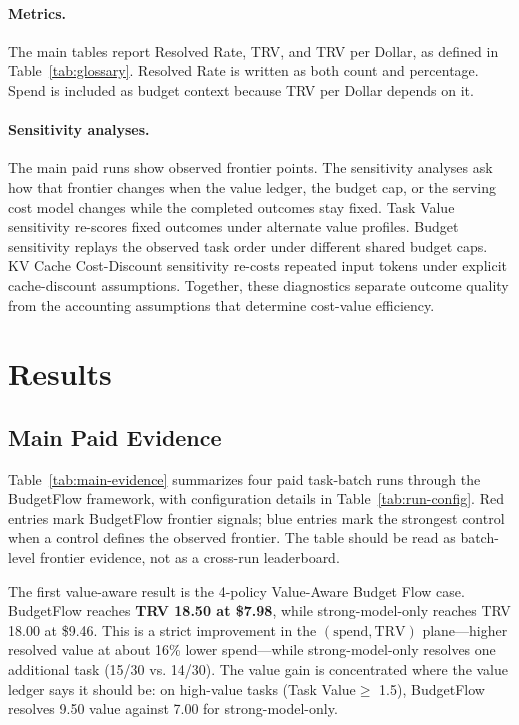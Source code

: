 \documentclass[sigconf,review,anonymous]{acmart}
\newcommand{\method}{BudgetFlow\xspace}
\newcommand{\trv}{TRV\xspace}
\newcommand{\taskvalue}{Task Value\xspace}
\begin{document}
\paragraph{Metrics.}
The main tables report Resolved Rate, \trv, and \trv per Dollar, as defined in Table~\ref{tab:glossary}. Resolved Rate is written as both count and percentage. Spend is included as budget context because \trv per Dollar depends on it.

\paragraph{Sensitivity analyses.}
The main paid runs show observed frontier points. The sensitivity analyses ask how that frontier changes when the value ledger, the budget cap, or the serving cost model changes while the completed outcomes stay fixed. Task Value sensitivity re-scores fixed outcomes under alternate value profiles. Budget sensitivity replays the observed task order under different shared budget caps. KV Cache Cost-Discount sensitivity re-costs repeated input tokens under explicit cache-discount assumptions. Together, these diagnostics separate outcome quality from the accounting assumptions that determine cost-value efficiency.

\section{Results}
\label{sec:results}
\subsection{Main Paid Evidence}
Table~\ref{tab:main-evidence} summarizes four paid task-batch runs through the \method framework, with configuration details in Table~\ref{tab:run-config}. Red entries mark BudgetFlow frontier signals; blue entries mark the strongest control when a control defines the observed frontier. The table should be read as batch-level frontier evidence, not as a cross-run leaderboard.

The first value-aware result is the 4-policy Value-Aware Budget Flow case. \method reaches \textbf{\trv 18.50 at \$7.98}, while strong-model-only reaches \trv 18.00 at \$9.46. This is a strict improvement in the $(\mathrm{spend}, \mathrm{\trv})$ plane---higher resolved value at about 16\% lower spend---while strong-model-only resolves one additional task (15/30 vs. 14/30). The value gain is concentrated where the value ledger says it should be: on high-value tasks (\taskvalue $\geq$ 1.5), \method resolves 9.50 value against 7.00 for strong-model-only.
\end{document}
